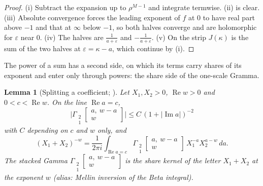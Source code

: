 \documentclass[11pt]{article}
\theoremstyle{plain}
\newtheorem{lemma}[prop]{Lemma}
\theoremstyle{definition}
\theoremstyle{remark}
\newcommand{\Gst}[4]{\Gamma_{\substack{#1\\#2}}\!\begin{bmatrix}#3\\#4\end{bmatrix}}
\DeclareMathOperator{\re}{Re}
\DeclareMathOperator{\im}{Im}
\begin{document}
\begin{proof}
(i) Subtract the expansion up to $\rho^{M-1}$ and integrate termwise. (ii) is clear. (iii) Absolute convergence forces the leading exponent of $f$ at $0$ to have real part above $-1$ and that at $\infty$ below $-1$, so both halves converge and are holomorphic for $\varepsilon$ near $0$. (iv) The halves are $\frac1{a+\varepsilon}$ and $-\frac1{a+\varepsilon}$. (v) On the strip $J(\kappa)$ is the sum of the two halves at $\varepsilon=\kappa-a$, which continue by (i).
\end{proof}

The power of a sum has a second side, on which its terms carry shares of its exponent and enter only through powers: the share side of the one-scale Gramma.

\begin{lemma}[Splitting a coefficient; {\cite[Cor.~4.4, Thm.~4.5, p.~26]{F}}]\label{lem:split}
Let $X_1,X_2>0$, $\re w>0$ and $0<c<\re w$. On the line $\re a=c$,
\[
\big|\Gst21{a,\ w-a}{w}\big|\le C\,(1+|\im a|)^{-2}
\]
with $C$ depending on $c$ and $w$ only, and
\[
(X_1+X_2)^{-w}=\frac1{2\pi i}\int_{\re a=c}\Gst21{a,\ w-a}{w}\,X_1^{-a}X_2^{a-w}\,da .
\]
The stacked Gamma $\Gst21{a,\ w-a}{w}$ is the \emph{share kernel} of the letter $X_1+X_2$ at the exponent $w$ (alias: Mellin inversion of the Beta integral).
\end{lemma}
\end{document}
